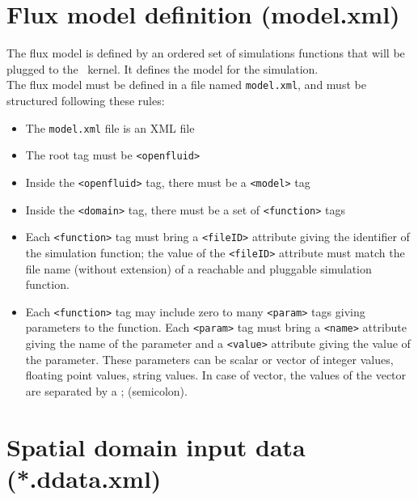 
\bigskip

\section{Flux model definition (model.xml)}

The flux model is defined by an ordered set of simulations functions that will be plugged to the \OFEname \ kernel.
It defines the model for the simulation.\\
The flux model must be defined in a file named \texttt{model.xml},
and must be structured following these rules:
\begin{itemize}
  \item The \texttt{model.xml} file is an XML file
  \item The root tag must be \texttt{<openfluid>}
  \item Inside the \texttt{<openfluid>} tag, there must be a \texttt{<model>} tag
  \item Inside the \texttt{<domain>} tag, there must be a set
  of \texttt{<function>} tags 
  \item Each \texttt{<function>} tag must bring a \texttt{<fileID>} attribute giving
  the identifier of the simulation function; the value of the \texttt{<fileID>} attribute must match the file name (without extension)
  of a reachable and pluggable simulation function.
  \item Each \texttt{<function>} tag may include zero to many \texttt{<param>} tags giving
  parameters to the function. Each \texttt{<param>} tag must bring a \texttt{<name>} attribute giving
  the name of the parameter and a \texttt{<value>} attribute giving the value of the parameter. These parameters can be scalar or vector of integer values, floating point values, string values. In case of vector, the values of the vector are separated by a ; (semicolon).  
\end{itemize}



\bigskip

\section{Spatial domain input data (*.ddata.xml)}

